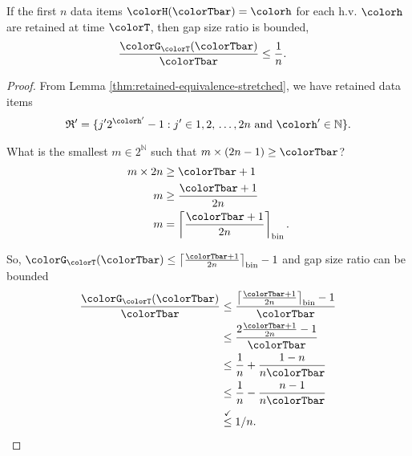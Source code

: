 \begin{lemma}
\label{thm:gap-size-ratio-stretched}
If the first $n$ data items $\colorH(\colorTbar) = \colorh$ for each h.v. $\colorh$ are retained at time $\colorT$, then gap size ratio is bounded,
\begin{align*}
\frac{\colorG_{\colorT}(\colorTbar)}{\colorTbar}
&\leq
\frac{1}{n}.
\end{align*}
\end{lemma}
\begin{proof}

From Lemma \ref{thm:retained-equivalence-stretched}, we have retained data items
\begin{align*}
\mathfrak{R}' =
\{
  j'2^{\colorh'} - 1
  :
  j' \in 1,2,\,\ldots,2n
  \text{ and }
  \colorh' \in \mathbb{N}
\}.
\end{align*}


What is the smallest $m \in 2^{\mathbb{N}}$ such that $m \times (2n - 1) \geq \colorTbar$?
\begin{align*}
m \times 2n
&\geq \colorTbar + 1\\
m
&\geq \frac{\colorTbar + 1}{2n}\\
m
&= \left\lceil \frac{\colorTbar + 1 }{2n} \right\rceil_{\mathrm{bin}}.
\end{align*}

So, $\colorG_{\colorT}(\colorTbar) \leq \left\lceil \frac{\colorTbar + 1 }{2n} \right\rceil_{\mathrm{bin}} - 1$ and gap size ratio can be bounded
\begin{align*}
\frac{\colorG_{\colorT}(\colorTbar)}{\colorTbar}
&\leq
\frac{
\left\lceil \frac{\colorTbar + 1 }{2n} \right\rceil_{\mathrm{bin}} - 1
}{
\colorTbar
}\\
&\leq
\frac{
2\frac{\colorTbar + 1}{2n} - 1
}{
\colorTbar
}\\
&\leq
\frac{1}{n} + \frac{1 - n}{n\colorTbar}\\
&\leq
\frac{1}{n} - \frac{n - 1}{n\colorTbar}\\
&\stackrel{\checkmark}{\leq}
1 / n.
\end{align*}


\end{proof}
